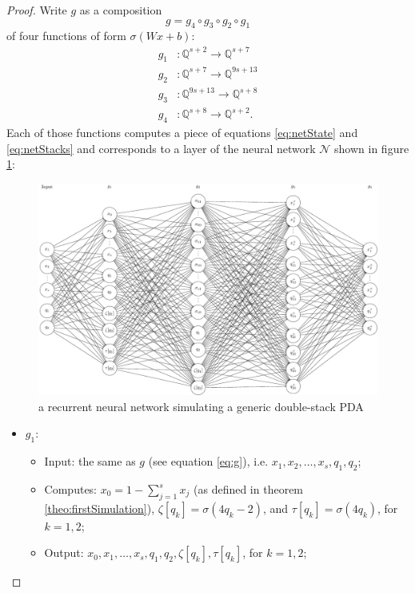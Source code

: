 \documentclass{book}
\newcommand{\Q}{\mathbb{Q}}
\theoremstyle{definition}
\theoremstyle{plain}
\theoremstyle{plain}
\theoremstyle{remark}
\theoremstyle{plain}
\begin{document}
\begin{proof}
		Write $g$ as a composition $$g=g_4\circ g_3\circ g_2\circ g_1$$ of four functions of form $\sigma(Wx+b)$: 
		\begin{align*}
			g_1&:\Q^{s+2}\to\Q^{s+7} \\
			g_2&:\Q^{s+7}\to\Q^{9s+13} \\
			g_3&:\Q^{9s+13}\to\Q^{s+8} \\
			g_4&:\Q^{s+8}\to \Q^{s+2}.
		\end{align*}
		 Each of those functions computes a piece of equations \ref{eq:netState} and \ref{eq:netStacks} and corresponds to a layer of the neural network $\mathcal{N}$ shown in figure \ref{fig:net}:
		 \begin{figure}
		 	\centering
		 	\includegraphics[width=\textwidth]{netImage.pdf}
		 	\caption{a recurrent neural network simulating a generic double-stack PDA}
		 	\label{fig:net}
		 \end{figure}
		\begin{itemize}
			\item $g_1$: 
			\begin{itemize}
				\item Input: the same as $g$ (see equation \ref{eq:g}), i.e. $x_1,x_2,\dots,x_s,q_1,q_2$;
				\item Computes: $x_0=1-\sum_{j=1}^{s}x_j$ (as defined in theorem \ref{theo:firstSimulation}), $\zeta[q_k]=\sigma(4q_k-2)$, and $\tau[q_k]=\sigma(4q_k)$, for $k=1,2$;
				\item Output: $x_0,x_1,\dots,x_s,q_1,q_2,\zeta[q_k],\tau[q_k]$, for $k=1,2$;
			\end{itemize}
			

\end{itemize}
\end{proof}
\end{document}

